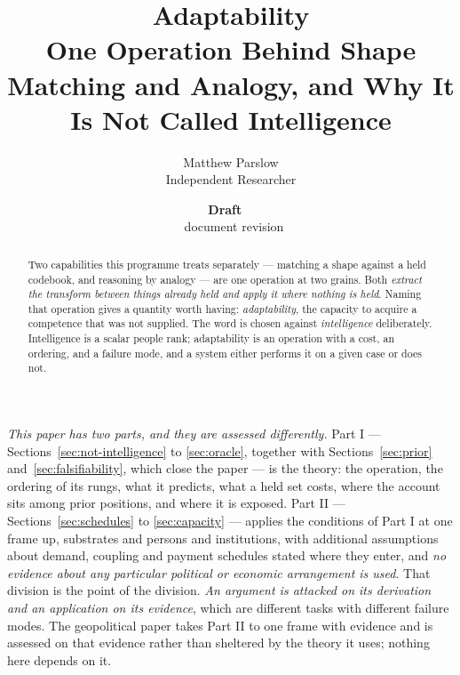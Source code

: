 \documentclass[11pt,a4paper]{article}
\title{Adaptability\\\large One Operation Behind Shape Matching and Analogy, and Why It Is Not Called Intelligence}
\author{Matthew Parslow\\Independent Researcher}
\date{\textbf{Draft \texorpdfstring{\textemdash}{---}\ \PaperDraft}\\[2pt]\PaperDisplayDate \texorpdfstring{\textbullet}{\textperiodcentered}\ document revision \PaperRevision}
\theoremstyle{remark}
\begin{document}
\maketitle
\begin{center}
\end{center}
\vspace{1em}

\begin{abstract}
Two capabilities this programme treats separately --- matching a shape against a held codebook, and
reasoning by analogy --- are one operation at two grains. Both \emph{extract the transform between
things already held and apply it where nothing is held}. Naming that operation gives a quantity worth
having: \emph{adaptability}, the capacity to acquire a competence that was not supplied. The word is
chosen against \emph{intelligence} deliberately. Intelligence is a scalar people rank; adaptability is
an operation with a cost, an ordering, and a failure mode, and a system either performs it on a given
case or does not.
\end{abstract}

\emph{This paper has two parts, and they are assessed differently.} Part I ---
Sections~\ref{sec:not-intelligence} to \ref{sec:oracle}, together with Sections~\ref{sec:prior}
and~\ref{sec:falsifiability}, which close the paper --- is the theory: the operation, the ordering of
its rungs, what it predicts, what a held set costs, where the account sits among prior positions, and
where it is exposed. Part II --- Sections~\ref{sec:schedules} to \ref{sec:capacity} --- applies the conditions
of Part I at one frame up, substrates and persons and institutions, with additional assumptions about demand, coupling and payment schedules stated where they enter, and \emph{no evidence about any particular political or economic arrangement is
used}. That division is the point of the division. \emph{An argument is attacked on its derivation and
an application on its evidence}, which are different tasks with different failure modes. The
geopolitical paper takes Part II to one frame with evidence and is assessed on that evidence rather
than sheltered by the theory it uses; nothing here depends on it.
\end{document}
